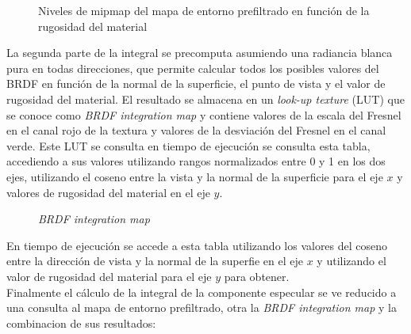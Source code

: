         
        \begin{figure}[H]
            \vspace{0.5cm}
            \centering
            \caption{Niveles de mipmap del mapa de entorno prefiltrado en funci\'on de la rugosidad del material}
        \end{figure}
        \singlespacing


        La segunda parte de la integral se precomputa asumiendo una radiancia blanca pura en todas direcciones, que permite calcular
        todos los posibles valores del BRDF en funci\'on de la normal de la superficie, el punto de vista y el valor de rugosidad del material.
        El resultado se almacena en un \textit{look-up texture} (LUT) que se conoce como \textit{BRDF integration map} y contiene
        valores de la escala del Fresnel en el canal rojo de la textura y valores de la desviaci\'on del Fresnel en el canal verde.
        Este LUT se consulta en tiempo de ejecuci\'on se consulta esta tabla, accediendo a sus valores utilizando rangos normalizados entre
        0 y 1 en los dos ejes, utilizando el coseno entre la vista y la normal de la superficie para el eje $x$ y valores de rugosidad
        del material en el eje $y$.

        \begin{figure}[H]
            \vspace{0.5cm}
            \centering
            \caption{\textit{BRDF integration map}}
        \end{figure}
        \singlespacing

        
        En tiempo de ejecuci\'on se accede a esta tabla
        utilizando los valores del coseno entre la direcci\'on de vista y la normal de la superfie en el eje $x$ y utilizando
        el valor de rugosidad del material para el eje $y$ para obtener.\\

        Finalmente el c\'alculo de la integral de la componente especular se ve reducido a una consulta al mapa de entorno prefiltrado,
        otra la \textit{BRDF integration map} y la combinacion de sus resultados:

